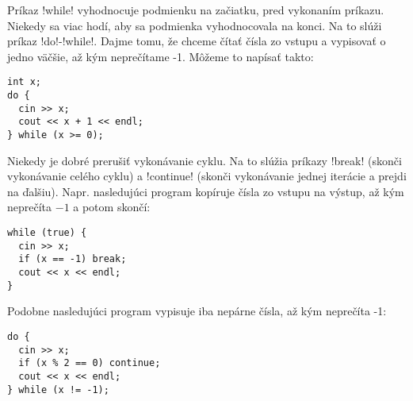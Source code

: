 Príkaz \prg!while! vyhodnocuje podmienku na začiatku, pred vykonaním príkazu. Niekedy
sa viac hodí, aby sa podmienka vyhodnocovala na konci. Na to slúži príkaz 
\hbox{\prg!do!-\prg!while!}. Dajme tomu, že chceme čítať čísla zo vstupu
a vypisovať o jedno väčšie, až kým neprečítame -1. Môžeme to napísať takto:\\

\begin{lstlisting}
int x;
do {
  cin >> x;
  cout << x + 1 << endl;
} while (x >= 0);
\end{lstlisting}

Niekedy je dobré prerušiť vykonávanie cyklu. Na to slúžia príkazy \prg!break! (skonči
vykonávanie celého cyklu) a \prg!continue! (skonči vykonávanie jednej iterácie a prejdi 
na ďalšiu). Napr. nasledujúci program kopíruje čísla zo vstupu na výstup, 
až kým neprečíta $-1$ a potom skončí:\\

\begin{lstlisting}
while (true) {
  cin >> x;
  if (x == -1) break;
  cout << x << endl;
}
\end{lstlisting}


Podobne nasledujúci program vypisuje iba nepárne čísla, až kým neprečíta -1:\\

\begin{lstlisting}
do {
  cin >> x;
  if (x % 2 == 0) continue;
  cout << x << endl;
} while (x != -1);
\end{lstlisting}

